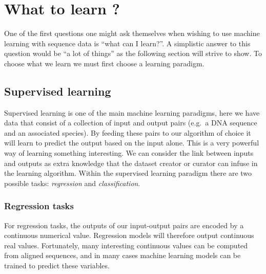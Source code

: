\documentclass[
  11pt,
  twoside,
  BCOR=10mm,
  listof=totoc]{scrbook}
\begin{document}
\hypertarget{what-to-learn}{%
\section{What to learn ?}\label{what-to-learn}}

One of the first questions one might ask themselves when wishing to use machine learning with sequence data is ``what can I learn?''. A simplistic answer to this question would be ``a lot of things'' as the following section will strive to show. To choose what we learn we must first choose a learning paradigm.

\hypertarget{supervised-learning}{%
\subsection{Supervised learning}\label{supervised-learning}}

Supervised learning is one of the main machine learning paradigms, here we have data that consist of a collection of input and output pairs (e.g.~a DNA sequence and an associated species). By feeding these pairs to our algorithm of choice it will learn to predict the output based on the input alone. This is a very powerful way of learning something interesting. We can consider the link between inputs and outputs as extra knowledge that the dataset creator or curator can infuse in the learning algorithm. Within the supervised learning paradigm there are two possible tasks: \emph{regression} and \emph{classification}.

\hypertarget{regression-tasks}{%
\subsubsection{Regression tasks}\label{regression-tasks}}

For regression tasks, the outputs of our input-output pairs are encoded by a continuous numerical value. Regression models will therefore output continuous real values. Fortunately, many interesting continuous values can be computed from aligned sequences, and in many cases machine learning models can be trained to predict these variables.
\end{document}
